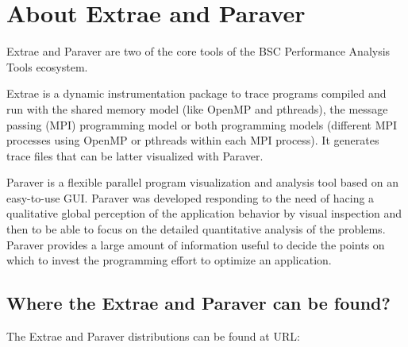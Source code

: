 \documentclass[twoside,a4,english,11pt]{book}
\begin{document}

\section{About \textsf{Extrae} and \textsf{Paraver}}

\textsf{Extrae} and \textsf{Paraver} are two of the core tools of the BSC 
Performance Analysis Tools ecosystem.

\textsf{Extrae} is a dynamic instrumentation package to trace programs compiled
and run with the shared memory model (like OpenMP and pthreads), the message
passing (MPI) programming model or both programming models (different MPI
processes using OpenMP or pthreads within each MPI process). It generates trace
files that can be latter visualized with \textsf{Paraver}.

\textsf{Paraver} is a flexible parallel program visualization and analysis tool
based on an easy-to-use GUI. \textsf{Paraver} was developed responding to the
need of hacing a qualitative global perception of the application behavior by
visual inspection and then to be able to focus on the detailed quantitative
analysis of the problems. \textsf{Paraver} provides a large amount of
information useful to decide the points on which to invest the programming
effort to optimize an application.

\subsection{Where the \textsf{Extrae} and \textsf{Paraver} can be found?}

The \textsf{Extrae} and \textsf{Paraver} distributions can be found at URL:

  \begin{figure}[!h]
  

  \end{figure}
\end{document}

